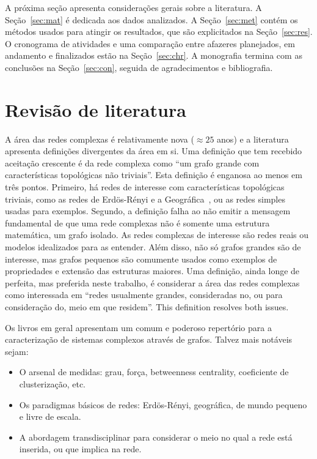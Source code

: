 \documentclass[a4paper,openright,12pt]{report} %
\begin{document}
A próxima seção apresenta considerações gerais sobre a literatura.
A Seção~\ref{sec:mat} é dedicada aos dados analizados.
A Seção~\ref{sec:met} contém os métodos usados para atingir os resultados, que são explicitados na Seção~\ref{sec:res}. O cronograma de atividades e uma comparação entre afazeres planejados, em andamento e finalizados
estão na Seção~\ref{sec:chr}.
A monografia termina com as conclusões na Seção~\ref{sec:con}, seguida de agradecimentos e bibliografia.


\section{Revisão de literatura}
A área das redes complexas é relativamente nova ($\approx 25$ anos)
e a literatura apresenta definições divergentes da área em si.
Uma definição que tem recebido aceitação crescente
é da rede complexa como ``um grafo grande com características topológicas
não triviais''. Esta definição é enganosa ao menos em três pontos.
Primeiro, há redes de interesse com características topológicas triviais, como as redes de Erdös-Rényi e a Geográfica~\cite{newman}, ou as redes simples usadas para exemplos.
Segundo, a definição falha ao não emitir a mensagem fundamental de que uma rede complexas não é somente uma estrutura matemática, um grafo isolado. As redes complexas de interesse são redes reais ou modelos idealizados para as entender.
Além disso, não só grafos grandes são de interesse, mas grafos pequenos são comumente usados como exemplos de propriedades e extensão das estruturas maiores.
Uma definição, ainda longe de perfeita, mas preferida neste trabalho, é considerar a área das redes complexas como interessada em
``redes usualmente grandes, consideradas no, ou para consideração do,
meio em que residem''.
This definition resolves both issues.

Os livros em geral apresentam um comum e poderoso repertório para a caracterização de sistemas complexos através de grafos. Talvez mais notáveis sejam:
\begin{itemize}
	\item O arsenal de medidas: grau, força, betweenness centrality, coeficiente de clusterização, etc.
	\item Os paradigmas básicos de redes: Erdös-Rényi, geográfica, de mundo pequeno e livre de escala.
	\item A abordagem transdisciplinar para considerar o meio no qual a rede está inserida, ou que implica na rede.
\end{itemize}
\end{document}
